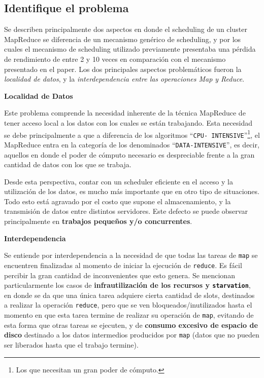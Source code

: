 \documentclass[11pt, a4paper, twoside]{article}
\begin{document}
\clearpage
\subsection {\footnotesize Identifique el problema}
\label{investigacion-2}

Se describen principalmente dos aspectos en donde el scheduling de un cluster
MapReduce se diferencia de un mecanismo genérico de scheduling, y por los cuales
el mecanismo de scheduling utilizado previamente presentaba una pérdida de
rendimiento de entre 2 y 10 veces en comparación con el mecanismo presentado en
el paper. Los dos principales aspectos problemáticos fueron la \emph{localidad
de datos}, y la \emph{interdependencia entre las operaciones Map y Reduce}.

\begin{center}
\textbf{Localidad de Datos}
\end{center}
Este problema comprende la necesidad inherente de la técnica MapReduce de tener
acceso local a los datos con los cuales se están trabajando. Esta necesidad se
debe principalmente a que a diferencia de los algoritmos ``\texttt{CPU-
INTENSIVE}''\footnote{Los que necesitan un gran poder de cómputo.}, el MapReduce
entra en la categoría de los denominados ``\texttt{DATA-INTENSIVE}'', es decir,
aquellos en donde el poder de cómputo necesario es despreciable frente a la gran
cantidad de datos con los que se trabaja.

Desde esta perspectiva, contar con un scheduler eficiente en el acceso y la
utilización de los datos, es mucho más importante que en otro tipo de
situaciones. Todo esto está agravado por el costo que supone el almacenamiento,
y la transmisión de datos entre distintos servidores. Este defecto se puede
observar principalmente en \textbf{trabajos pequeños y/o concurrentes}.


\begin{center}
\textbf{Interdependencia}
\end{center}
Se entiende por interdependencia a la necesidad de que todas las tareas de
\texttt{map} se encuentren finalizadas al momento de iniciar la ejecución de
\texttt{reduce}. Es fácil percibir la gran cantidad de inconvenientes que esto
genera. Se mencionan particularmente los casos de \textbf{infrautilización de
los recursos y \texttt{starvation}}, en donde se da que una única tarea adquiere
cierta cantidad de slots, destinados a realizar la operación \texttt{reduce},
pero que se ven bloqueados/inutilizados hasta el momento en que esta tarea
termine de realizar su operación de \texttt{map}, evitando de esta forma que
otras tareas se ejecuten, y de \textbf{consumo excesivo de espacio de disco}
destinado a los datos intermedios producidos por \texttt{map} (datos que no
pueden ser liberados hasta que el trabajo termine).
\end{document}

